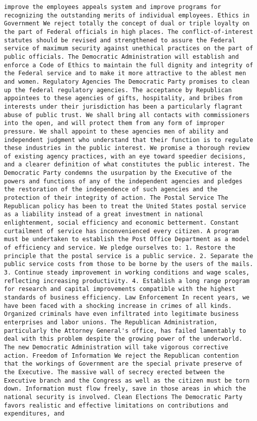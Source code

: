 \documentclass[
]{article}
\begin{document}
\begin{verbatim}
improve the employees appeals system and improve programs for recognizing the outstanding merits of individual employees. Ethics in Government We reject totally the concept of dual or triple loyalty on the part of Federal officials in high places. The conflict-of-interest statutes should be revised and strengthened to assure the Federal service of maximum security against unethical practices on the part of public officials. The Democratic Administration will establish and enforce a Code of Ethics to maintain the full dignity and integrity of the Federal service and to make it more attractive to the ablest men and women. Regulatory Agencies The Democratic Party promises to clean up the federal regulatory agencies. The acceptance by Republican appointees to these agencies of gifts, hospitality, and bribes from interests under their jurisdiction has been a particularly flagrant abuse of public trust. We shall bring all contacts with commissioners into the open, and will protect them from any form of improper pressure. We shall appoint to these agencies men of ability and independent judgment who understand that their function is to regulate these industries in the public interest. We promise a thorough review of existing agency practices, with an eye toward speedier decisions, and a clearer definition of what constitutes the public interest. The Democratic Party condemns the usurpation by the Executive of the powers and functions of any of the independent agencies and pledges the restoration of the independence of such agencies and the protection of their integrity of action. The Postal Service The Republican policy has been to treat the United States postal service as a liability instead of a great investment in national enlightenment, social efficiency and economic betterment. Constant curtailment of service has inconvenienced every citizen. A program must be undertaken to establish the Post Office Department as a model of efficiency and service. We pledge ourselves to: 1. Restore the principle that the postal service is a public service. 2. Separate the public service costs from those to be borne by the users of the mails. 3. Continue steady improvement in working conditions and wage scales, reflecting increasing productivity. 4. Establish a long range program for research and capital improvements compatible with the highest standards of business efficiency. Law Enforcement In recent years, we have been faced with a shocking increase in crimes of all kinds. Organized criminals have even infiltrated into legitimate business enterprises and labor unions. The Republican Administration, particularly the Attorney General's office, has failed lamentably to deal with this problem despite the growing power of the underworld. The new Democratic Administration will take vigorous corrective action. Freedom of Information We reject the Republican contention that the workings of Government are the special private preserve of the Executive. The massive wall of secrecy erected between the Executive branch and the Congress as well as the citizen must be torn down. Information must flow freely, save in those areas in which the national security is involved. Clean Elections The Democratic Party favors realistic and effective limitations on contributions and expenditures, and 
\end{verbatim}
\end{document}
